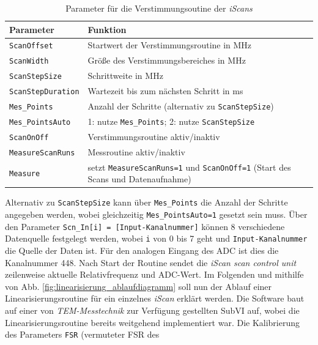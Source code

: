 \begin{table}
	\begin{tabular}{p{}p{}}
		\toprule
			Parameter & Funktion \\
		\midrule[1px]
		\hline
			\lstinline|ScanOffset| & Startwert der Verstimmungsroutine in MHz\\
			\lstinline|ScanWidth| & Größe des Verstimmungsbereiches in MHz\\
			\lstinline|ScanStepSize| & Schrittweite in MHz\\
			\lstinline|ScanStepDuration| & Wartezeit bis zum nächsten Schritt in ms\\
			\lstinline|Mes_Points| & Anzahl der Schritte (alternativ zu
			\lstinline|ScanStepSize|)\\
			\lstinline|Mes_PointsAuto| & 1: nutze \lstinline|Mes_Points|; 2: nutze
			\lstinline|ScanStepSize|\\
			\lstinline|ScanOnOff| & Verstimmungsroutine aktiv/inaktiv\\
			\lstinline|MeasureScanRuns| & Messroutine aktiv/inaktiv\\
			\lstinline|Measure| & setzt
			\lstinline|MeasureScanRuns=1| und \lstinline|ScanOnOff=1| (Start des Scans
			und Datenaufnahme)\\
		\bottomrule[1px]
	\end{tabular}
	\caption[Parameter der Verstimmungsoutine]{Parameter für die
	Verstimmungsoutine der \textit{iScans}}
	\label{tab:verstimmungsroutine_parameter}
\end{table}
Alternativ zu \lstinline|ScanStepSize| kann über \lstinline|Mes_Points| die
Anzahl der Schritte angegeben werden, wobei gleichzeitig
\lstinline|Mes_PointsAuto=1| gesetzt sein muss. Über den Parameter
\lstinline|Scn_In[i] = [Input-Kanalnummer]| können 8
verschiedene Datenquelle festgelegt werden, wobei
\lstinline|i| von 0 bis 7 geht und \lstinline|Input-Kanalnummer| die Quelle
der Daten ist. Für den analogen Eingang des ADC ist dies die Kanalnummer 448.
Nach Start der Routine sendet die \textit{iScan scan control unit} zeilenweise
aktuelle Relativfrequenz und ADC-Wert. Im Folgenden und mithilfe von Abb.
\ref{fig:linearisierung_ablaufdiagramm} soll nun der Ablauf einer
Linearisierungsroutine für ein einzelnes \textit{iScan} erklärt werden. Die
Software baut auf einer von \textit{TEM-Messtechnik} zur Verfügung gestellten
SubVI auf, wobei die Linearisierungsroutine bereits weitgehend implementiert
war. Die Kalibrierung des Parameters \lstinline|FSR| (vermuteter FSR des
